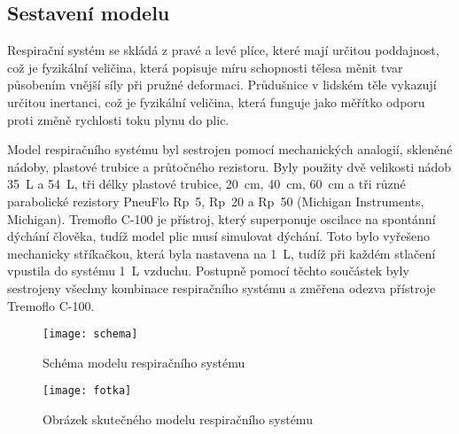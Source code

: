 \subsection{Sestavení modelu}
Respirační systém se skládá z pravé a levé plíce, které mají určitou poddajnost, což je fyzikální veličina, která popisuje míru schopnosti tělesa měnit tvar působením vnější síly při pružné deformaci. \cite{Poddajnost} Průdušnice v lidském těle vykazují určitou inertanci, což je fyzikální veličina, která funguje jako měřítko odporu proti změně rychlosti toku plynu do plic. \cite{Inertance}

 Model respiračního systému  byl sestrojen pomocí mechanických analogií, skleněné nádoby, plastové trubice a průtočného rezistoru. Byly použity dvě velikosti nádob \SI{35}{L} a \SI{54}{L}, tři délky plastové trubice, \SI{20}{cm},  \SI{40}{cm},  \SI{60}{cm}  a tři různé parabolické rezistory PneuFlo Rp~5, Rp~20 a Rp~50 (Michigan Instruments, Michigan). 
Tremoflo C-100 je přístroj, který superponuje oscilace na spontánní dýchání člověka, tudíž model plic musí simulovat dýchání. Toto bylo vyřešeno mechanicky stříkačkou, která byla nastavena na  \SI{1}{L}, tudíž při každém stlačení vpustila do systému  \SI{1}{L} vzduchu. 
Postupně pomocí těchto součástek byly sestrojeny všechny kombinace respiračního systému a změřena odezva přístroje Tremoflo C-100.

\begin{figure}[!ht]
			\centering
 			\texttt{[image: schema]}
			\caption{Schéma modelu respiračního systému}
			 \label{obrazekschema}
 \end{figure}

\begin{figure}[!ht]
			\centering
 			\texttt{[image: fotka]}
			\caption{Obrázek skutečného modelu respiračního systému}
			 \label{obrazekreal}
 \end{figure}

\clearpage

